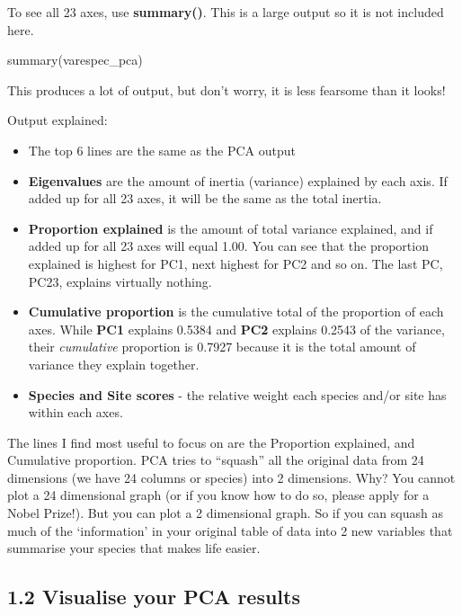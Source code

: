 \documentclass[
]{article}
\newenvironment{Shaded}{\begin{snugshade}}{\end{snugshade}}
\newcommand{\FunctionTok}[1]{\textcolor[rgb]{0.00,0.00,0.00}{#1}}
\newcommand{\NormalTok}[1]{#1}
\providecommand{\tightlist}{%
  \setlength{\itemsep}{0pt}\setlength{\parskip}{0pt}}
\begin{document}
To see all 23 axes, use \textbf{summary()}. This is a large output so it
is not included here.

\begin{Shaded}
\begin{Highlighting}[]
\FunctionTok{summary}\NormalTok{(varespec\_pca)}
\end{Highlighting}
\end{Shaded}

This produces a lot of output, but don't worry, it is less fearsome than
it looks!

Output explained:

\begin{itemize}
\tightlist
\item
  The top 6 lines are the same as the PCA output
\item
  \textbf{Eigenvalues} are the amount of inertia (variance) explained by
  each axis. If added up for all 23 axes, it will be the same as the
  total inertia.
\item
  \textbf{Proportion explained} is the amount of total variance
  explained, and if added up for all 23 axes will equal 1.00. You can
  see that the proportion explained is highest for PC1, next highest for
  PC2 and so on. The last PC, PC23, explains virtually nothing.
\item
  \textbf{Cumulative proportion} is the cumulative total of the
  proportion of each axes. While \textbf{PC1} explains 0.5384 and
  \textbf{PC2} explains 0.2543 of the variance, their \emph{cumulative}
  proportion is 0.7927 because it is the total amount of variance they
  explain together.
\item
  \textbf{Species and Site scores} - the relative weight each species
  and/or site has within each axes.
\end{itemize}

The lines I find most useful to focus on are the Proportion explained,
and Cumulative proportion. PCA tries to ``squash'' all the original data
from 24 dimensions (we have 24 columns or species) into 2 dimensions.
Why? You cannot plot a 24 dimensional graph (or if you know how to do
so, please apply for a Nobel Prize!). But you can plot a 2 dimensional
graph. So if you can squash as much of the `information' in your
original table of data into 2 new variables that summarise your species
that makes life easier.

\hypertarget{visualise-your-pca-results}{%
\subsection{1.2 Visualise your PCA
results}\label{visualise-your-pca-results}}
\end{document}
